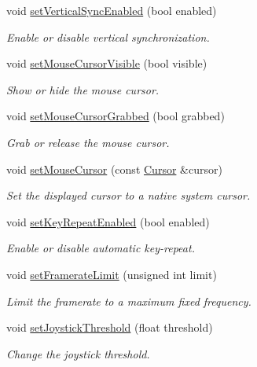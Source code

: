 \begin{DoxyCompactItemize}
void \mbox{\hyperlink{classsf_1_1_window_a59041c4556e0351048f8aff366034f61}{set\+Vertical\+Sync\+Enabled}} (bool enabled)
\begin{DoxyCompactList}\small\item\em Enable or disable vertical synchronization. \end{DoxyCompactList}\item 
void \mbox{\hyperlink{classsf_1_1_window_aad3991c25e0a83afbb4d62febf9b7b14}{set\+Mouse\+Cursor\+Visible}} (bool visible)
\begin{DoxyCompactList}\small\item\em Show or hide the mouse cursor. \end{DoxyCompactList}\item 
void \mbox{\hyperlink{classsf_1_1_window_a5b4ef8ede77531e17b7a0287fa6ff9ce}{set\+Mouse\+Cursor\+Grabbed}} (bool grabbed)
\begin{DoxyCompactList}\small\item\em Grab or release the mouse cursor. \end{DoxyCompactList}\item 
void \mbox{\hyperlink{classsf_1_1_window_aab7a05baece72b08ad120063b143d19b}{set\+Mouse\+Cursor}} (const \mbox{\hyperlink{classsf_1_1_cursor}{Cursor}} \&cursor)
\begin{DoxyCompactList}\small\item\em Set the displayed cursor to a native system cursor. \end{DoxyCompactList}\item 
void \mbox{\hyperlink{classsf_1_1_window_aef9f2b14c10ecba8a8df95dd51c5bb73}{set\+Key\+Repeat\+Enabled}} (bool enabled)
\begin{DoxyCompactList}\small\item\em Enable or disable automatic key-\/repeat. \end{DoxyCompactList}\item 
void \mbox{\hyperlink{classsf_1_1_window_af4322d315baf93405bf0d5087ad5e784}{set\+Framerate\+Limit}} (unsigned int limit)
\begin{DoxyCompactList}\small\item\em Limit the framerate to a maximum fixed frequency. \end{DoxyCompactList}\item 
void \mbox{\hyperlink{classsf_1_1_window_aa45b8f54e29a6f59f1fc7ee66b2fab68}{set\+Joystick\+Threshold}} (float threshold)
\begin{DoxyCompactList}\small\item\em Change the joystick threshold. \end{DoxyCompactList}\item 

\end{DoxyCompactItemize}

